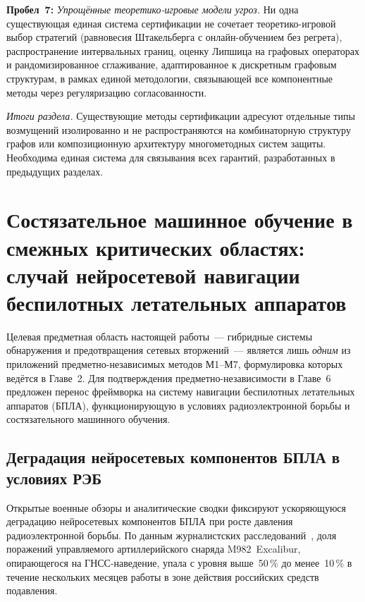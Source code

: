 \noindent\textbf{Пробел~7:} \emph{Упрощённые теоретико-игровые модели угроз.} Ни одна существующая единая система сертификации не сочетает теоретико-игровой выбор стратегий (равновесия Штакельберга с онлайн-обучением без регрета), распространение интервальных границ, оценку Липшица на графовых операторах и рандомизированное сглаживание, адаптированное к дискретным графовым структурам, в рамках единой методологии, связывающей все компонентные методы через регуляризацию согласованности.

\medskip
\noindent\textit{Итоги раздела.} Существующие методы сертификации адресуют отдельные типы возмущений изолированно и не распространяются на комбинаторную структуру графов или композиционную архитектуру многометодных систем защиты. Необходима единая система для связывания всех гарантий, разработанных в предыдущих разделах.

\section{Состязательное машинное обучение в смежных критических областях: случай нейросетевой навигации беспилотных летательных аппаратов}
\label{sec:ch1_uav_related}

Целевая предметная область настоящей работы~--- гибридные системы
обнаружения и предотвращения сетевых вторжений~--- является лишь
\emph{одним} из приложений предметно-независимых методов \textsf{М1}--\textsf{М7},
формулировка которых ведётся в Главе~2. Для подтверждения
предметно-независимости в Главе~6 предложен перенос фреймворка
на систему навигации беспилотных летательных аппаратов (БПЛА),
функционирующую в условиях радиоэлектронной борьбы и состязательного
машинного обучения.

\subsection{Деградация нейросетевых компонентов БПЛА в условиях РЭБ}

Открытые военные обзоры и аналитические сводки фиксируют ускоряющуюся
деградацию нейросетевых компонентов БПЛА при росте давления
радиоэлектронной борьбы. По данным журналистских
расследований~\cite{wapo_excalibur_2024}, доля поражений управляемого
артиллерийского снаряда M982~Excalibur, опирающегося на ГНСС-наведение,
упала с уровня выше~50\,\% до менее~10\,\% в течение нескольких
месяцев работы в зоне действия российских средств подавления.

